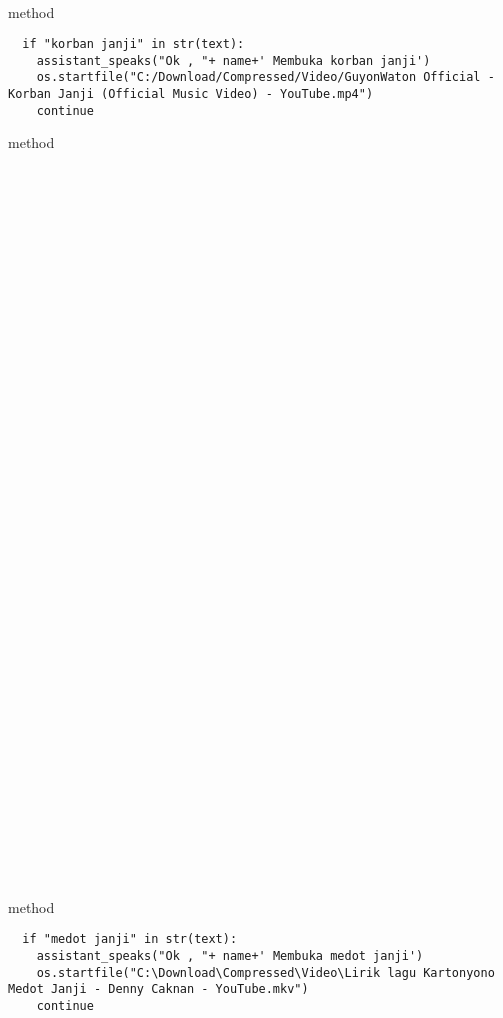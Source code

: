 \\
\\
\\
\\
\\
\\
 method 
\begin{lstlisting}
  if "korban janji" in str(text):
    assistant_speaks("Ok , "+ name+' Membuka korban janji')
    os.startfile("C:/Download/Compressed/Video/GuyonWaton Official - Korban Janji (Official Music Video) - YouTube.mp4")       
    continue
\end{lstlisting}
 method 
\\
\\
\\
\\
\\
\\
\\
\\
\\
\\
\\
\\
\\
\\
\\
\\
\\
\\
\\
\\
\\
\\
\\
\\
\\
\\
\\
\\
\\
\\
\\
\\
\\
\\
\\
\\
\\
\\
\\
 method 
\begin{lstlisting}
  if "medot janji" in str(text):
    assistant_speaks("Ok , "+ name+' Membuka medot janji')
    os.startfile("C:\Download\Compressed\Video\Lirik lagu Kartonyono Medot Janji - Denny Caknan - YouTube.mkv")
    continue
\end{lstlisting}
